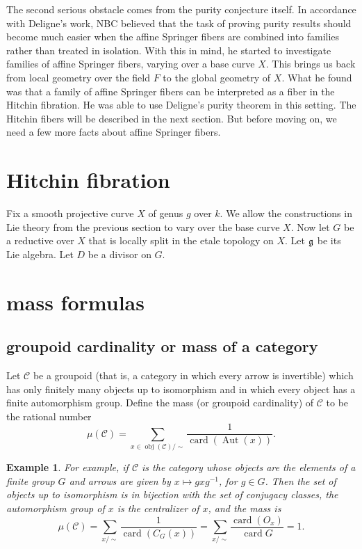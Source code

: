 \documentclass[brochure,english,12pt]{bourbaki}
\newtheorem{example}[equation]{Example}
\def\op#1{{\operatorname{#1}}}
\def\card{\op{card}}
\def\g{\frak{g}}
\def\C{{\mathcal C}}
\begin{document}
The second serious obstacle comes from the purity conjecture itself.
In accordance with Deligne's work, NBC believed that the task of proving
purity results should become much easier when the affine Springer fibers are
combined into families rather than treated in isolation.  With this in
mind, he started to investigate families of affine Springer fibers,
varying over a base curve $X$.  This brings us back from local
geometry over the field $F$ to the global geometry of $X$.  What he
found was that a family of affine Springer fibers can be interpreted as 
a fiber in the Hitchin fibration.  He was able to use Deligne's purity
theorem in this setting.  The Hitchin fibers will be described in the
next section.  But before moving on, we need a few more facts about
affine Springer fibers.




\section{Hitchin fibration}


Fix a smooth projective curve $X$ of genus $g$ over $k$.    We allow the constructions in Lie theory from
the previous section to vary over the base curve $X$.  Now let
 $G$ be a reductive over $X$ that is locally split in the etale topology on $X$.
Let $\g$ be its Lie algebra.  Let $D$ be a divisor on $G$.




\section{mass formulas}

\subsection{groupoid cardinality or mass of a category}

Let ${\C}$ be a groupoid (that is, a category in which every arrow is
invertible) which has only finitely many objects up to isomorphism and
in which every object has a finite automorphism group.  Define the
mass (or groupoid cardinality) of $\C$  to be the rational
number
\[
\mu(\C)= \sum_{x\in \op{obj}(\C)/\sim} \frac{1}{\op{card}(\op{Aut}(x))}.
\]

\begin{example}
For example, if ${\C}$ is the category whose objects are the elements of a finite group $G$
and arrows are given by $x \mapsto g x g^{-1}$, for $g\in G$.  Then the set of objects up to
isomorphism is in bijection with the set of conjugacy classes, the automorphism group of $x$ is the
centralizer of $x$,  and the mass is
\[
\mu(\C) = \sum_{x/\sim} \frac{1}{\op{card}(C_G(x))} = 
\sum_{x/\sim} \frac{\op{card}(O_x)}{\card{G}} = 1.
\]
\end{example}
\end{document}
